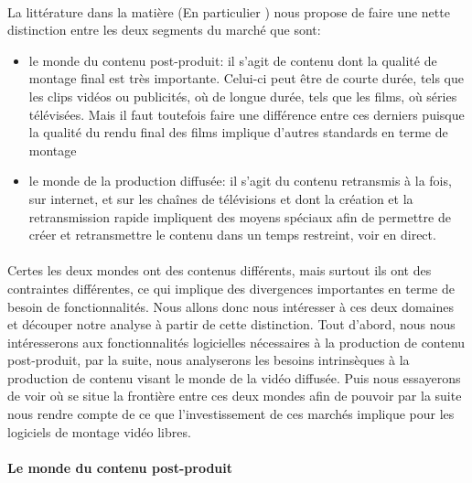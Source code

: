 \paragraph{}

La littérature dans la matière (En particulier
\cite{WorldVideoNonlinearEditingMarket}) nous propose de faire une nette
distinction entre  les deux segments du marché que sont:

\begin{itemize} \setlength{\itemsep}{2mm}

  \item {le monde du contenu post-produit: il s'agit de contenu dont la
  qualité de
    montage final est très importante. Celui-ci peut être de courte
    durée, tels que les clips vidéos ou publicités, où de longue
    durée, tels que les films, où séries télévisées. Mais il
    faut toutefois faire une différence entre ces derniers puisque la
    qualité du rendu final des films implique d'autres standards en
    terme de montage}

  \item {le monde de la production diffusée: il s'agit du contenu
  retransmis à la fois,
    sur internet, et sur les chaînes de télévisions et dont la
    création et la retransmission rapide impliquent des moyens spéciaux
    afin de permettre de créer et retransmettre le contenu dans un
    temps restreint, voir en direct.}

\end{itemize}

\paragraph{}

Certes les deux mondes ont des contenus différents, mais surtout
ils ont des contraintes différentes, ce qui implique des divergences
importantes en terme de besoin de fonctionnalités. Nous allons donc
nous intéresser à ces deux domaines et découper notre analyse à
partir de cette distinction. Tout d'abord, nous nous intéresserons aux
fonctionnalités logicielles nécessaires à la production de contenu
post-produit, par la suite, nous analyserons les besoins intrinsèques
à la production de contenu visant le monde de la vidéo diffusée. Puis
nous essayerons de voir où se situe la frontière entre ces deux mondes
afin de pouvoir par la suite nous rendre compte de ce que l'investissement
de ces marchés implique pour les logiciels de montage vidéo libres.

\paragraph{Le monde du contenu post-produit}


